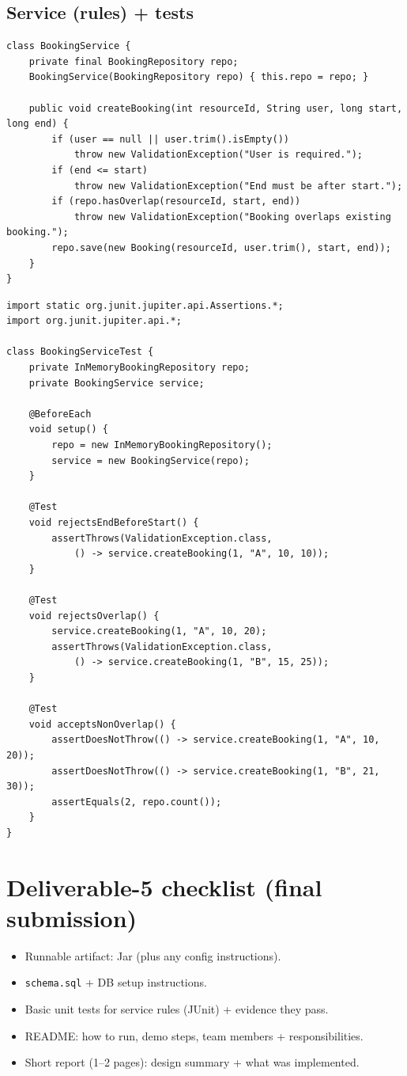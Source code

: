 \documentclass[11pt]{article}
\begin{document}
\subsection{Service (rules) + tests}
\begin{lstlisting}
class BookingService {
    private final BookingRepository repo;
    BookingService(BookingRepository repo) { this.repo = repo; }

    public void createBooking(int resourceId, String user, long start, long end) {
        if (user == null || user.trim().isEmpty())
            throw new ValidationException("User is required.");
        if (end <= start)
            throw new ValidationException("End must be after start.");
        if (repo.hasOverlap(resourceId, start, end))
            throw new ValidationException("Booking overlaps existing booking.");
        repo.save(new Booking(resourceId, user.trim(), start, end));
    }
}
\end{lstlisting}

\begin{lstlisting}
import static org.junit.jupiter.api.Assertions.*;
import org.junit.jupiter.api.*;

class BookingServiceTest {
    private InMemoryBookingRepository repo;
    private BookingService service;

    @BeforeEach
    void setup() {
        repo = new InMemoryBookingRepository();
        service = new BookingService(repo);
    }

    @Test
    void rejectsEndBeforeStart() {
        assertThrows(ValidationException.class,
            () -> service.createBooking(1, "A", 10, 10));
    }

    @Test
    void rejectsOverlap() {
        service.createBooking(1, "A", 10, 20);
        assertThrows(ValidationException.class,
            () -> service.createBooking(1, "B", 15, 25));
    }

    @Test
    void acceptsNonOverlap() {
        assertDoesNotThrow(() -> service.createBooking(1, "A", 10, 20));
        assertDoesNotThrow(() -> service.createBooking(1, "B", 21, 30));
        assertEquals(2, repo.count());
    }
}
\end{lstlisting}

\section{Deliverable-5 checklist (final submission)}
\begin{itemize}
  \item Runnable artifact: Jar (plus any config instructions).
  \item \texttt{schema.sql} + DB setup instructions.
  \item Basic unit tests for service rules (JUnit) + evidence they pass.
  \item README: how to run, demo steps, team members + responsibilities.
  \item Short report (1--2 pages): design summary + what was implemented.
\end{itemize}
\end{document}
